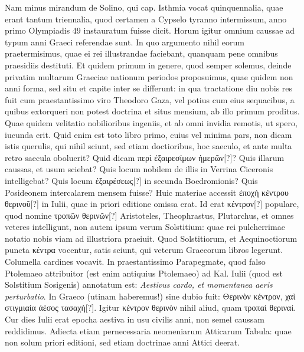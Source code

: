 Nam minus mirandum de Solino, qui cap. 
 Isthmia vocat
quinquennalia, quae erant tantum triennalia, quod certamen a Cypselo
tyranno intermissum, anno primo Olympiadis 49 instauratum
fuisse dicit.
Horum igitur omnium caussae ad typum anni Graeci referendae
sunt.
In quo argumento nihil eorum praetermisimus, quae
ei rei illustrandae faciebant, quanquam pene omnibus praesidiis
destituti.
Et quidem primum in genere, quod semper solemus, deinde
privatim multarum Graeciae nationum periodos proposuimus,
quae quidem non anni forma, sed situ et capite inter se differunt: in
qua tractatione diu nobis res fuit cum praestantissimo viro Theodoro
Gaza, vel potius cum eius sequacibus, a quibus extorqueri non
potest doctrina et situs mensium, ab illo primum proditus. 
Quae quidem
velitatio nobilioribus ingeniis, et ab omni invidia remotis, ut
spero, iucunda erit.
Quid enim est toto libro primo, cuius vel minima
pars, non dicam istis querulis, qui nihil sciunt, sed etiam doctioribus,
hoc saeculo, et ante multa retro saecula oboluerit?
Quid dicam
 \textgreek{περὶ ἐξαιρεσίμων ἡμερῶν[?]}?
Quis illarum caussas, et usum sciebat?
Quis
locum nobilem de illis in Verrina Ciceronis intelligebat?
Quis locum
\textgreek{ἐξαιρέσεως[?]} in secunda Boedromionis?
Quis Posideonem intercalarem
mensem fuisse?
Huic materiae accessit \textgreek{ἐποχὴ κέντρου θερινοῦ[?]}
in  Iulii, quae in priori editione omissa erat.
Id erat \textgreek{κέντρον[?]}
populare, quod nomine \textgreek{τροπῶν θερινῶν[?]}
 Aristoteles, Theophrastus,
Plutarchus, et omnes veteres intelligunt, non autem ipsum verum
Solstitium: quae rei pulcherrimae notatio nobis viam ad illustriora
praeiuit.
Quod Solstitiorum, et Aequinoctiorum puncta \textgreek{κέντρα} vocentur,
satis sciunt, qui veterum Graecorum libros legerunt.
Columella
cardines vocavit.
In praestantissimo Parapegmate, quod falso
Ptolemaeo attribuitor (est enim antiquius Ptolemaeo) ad  Kal.
Iulii (quod est Solstitium Sosigenis) annotatum est: \textit{Aestivus cardo,
et momentanea aeris perturbatio}.
In Graeco (utinam haberemus!)
sine dubio fuit: \textgreek{Θερινὸν κέντρον, χαὶ στιγμιαία ἀέσος τασαχή[?]}.
Igitur \textgreek{κέντρον
θερινὸν} nihil aliud, quam \textgreek{τροπαὶ θεριναί}.
Cur  dies Iulii erat
epocha aestiva in usu civilis anni, non semel caussam reddidimus. 
Adiecta etiam pernecessaria neomeniarum Atticarum Tabula: quae
non solum priori editioni, sed etiam doctrinae anni Attici deerat.

